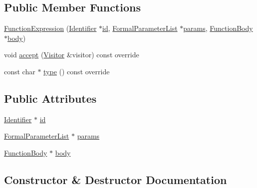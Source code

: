 \subsection*{Public Member Functions}
\begin{DoxyCompactItemize}
\item 
\hyperlink{struct_function_expression_aae0ca9ebecd1bdd51e7c7440c8cf2ec3}{Function\+Expression} (\hyperlink{struct_identifier}{Identifier} $\ast$\hyperlink{struct_function_expression_a448321d33ff9d2603dfdb0b14cf4fe24}{id}, \hyperlink{struct_formal_parameter_list}{Formal\+Parameter\+List} $\ast$\hyperlink{struct_function_expression_a5d02f2d692ae86ebdc36a3963042af65}{params}, \hyperlink{struct_function_body}{Function\+Body} $\ast$\hyperlink{struct_function_expression_af08f7dfdb616e122ab79c9a2e706061e}{body})
\item 
void \hyperlink{struct_function_expression_a66981757d45045284b41aecc85973434}{accept} (\hyperlink{struct_visitor}{Visitor} \&visitor) const override
\item 
const char $\ast$ \hyperlink{struct_function_expression_a77dba3202da208b3ba1583dd192856dd}{type} () const override
\end{DoxyCompactItemize}
\subsection*{Public Attributes}
\begin{DoxyCompactItemize}
\item 
\hyperlink{struct_identifier}{Identifier} $\ast$ \hyperlink{struct_function_expression_a448321d33ff9d2603dfdb0b14cf4fe24}{id}
\item 
\hyperlink{struct_formal_parameter_list}{Formal\+Parameter\+List} $\ast$ \hyperlink{struct_function_expression_a5d02f2d692ae86ebdc36a3963042af65}{params}
\item 
\hyperlink{struct_function_body}{Function\+Body} $\ast$ \hyperlink{struct_function_expression_af08f7dfdb616e122ab79c9a2e706061e}{body}
\end{DoxyCompactItemize}


\subsection{Constructor \& Destructor Documentation}
\mbox{\label{struct_function_expression_aae0ca9ebecd1bdd51e7c7440c8cf2ec3}} 
